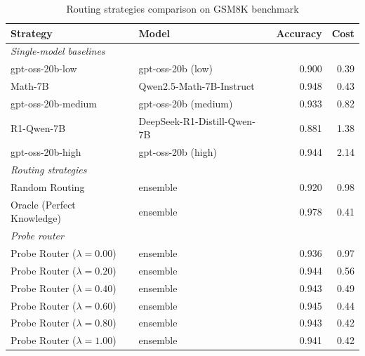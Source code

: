 \begin{table}[h!]
\centering
\caption{Routing strategies comparison on GSM8K benchmark}
\label{tab:GSM8K_routing_results}
\begin{tabular}{llrr}
\toprule
Strategy & Model & Accuracy & Cost \\
\midrule
\multicolumn{4}{l}{\textit{Single-model baselines}} \\
gpt-oss-20b-low & gpt-oss-20b (low) & 0.900 & 0.39 \\
Math-7B & Qwen2.5-Math-7B-Instruct & 0.948 & 0.43 \\
gpt-oss-20b-medium & gpt-oss-20b (medium) & 0.933 & 0.82 \\
R1-Qwen-7B & DeepSeek-R1-Distill-Qwen-7B & 0.881 & 1.38 \\
gpt-oss-20b-high & gpt-oss-20b (high) & 0.944 & 2.14 \\
\midrule
\multicolumn{4}{l}{\textit{Routing strategies}} \\
Random Routing & ensemble & 0.920 & 0.98 \\
Oracle (Perfect Knowledge) & ensemble & 0.978 & 0.41 \\
\midrule
\multicolumn{4}{l}{\textit{Probe router}} \\
Probe Router ($\lambda=0.00$) & ensemble & 0.936 & 0.97 \\
Probe Router ($\lambda=0.20$) & ensemble & 0.944 & 0.56 \\
Probe Router ($\lambda=0.40$) & ensemble & 0.943 & 0.49 \\
Probe Router ($\lambda=0.60$) & ensemble & 0.945 & 0.44 \\
Probe Router ($\lambda=0.80$) & ensemble & 0.943 & 0.42 \\
Probe Router ($\lambda=1.00$) & ensemble & 0.941 & 0.42 \\
\bottomrule
\end{tabular}
\end{table}